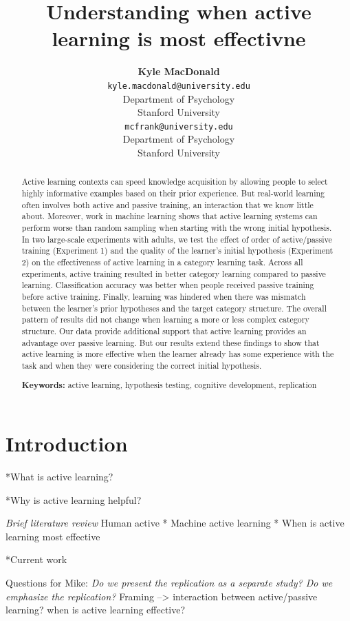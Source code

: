 \documentclass[10pt, letterpaper]{article}
\title{Understanding when active learning is most effectivne}
\author{{\large \bf Kyle MacDonald} \\ \texttt{kyle.macdonald@university.edu} \\ Department of Psychology \\ Stanford University \And {\large \bf Michael C. Frank} \\ \texttt{mcfrank@university.edu} \\ Department of Psychology \\ Stanford University}
\begin{document}
\maketitle

\begin{abstract}
Active learning contexts can speed knowledge acquisition by allowing
people to select highly informative examples based on their prior
experience. But real-world learning often involves both active and
passive training, an interaction that we know little about. Moreover,
work in machine learning shows that active learning systems can perform
worse than random sampling when starting with the wrong initial
hypothesis. In two large-scale experiments with adults, we test the
effect of order of active/passive training (Experiment 1) and the
quality of the learner's initial hypothesis (Experiment 2) on the
effectiveness of active learning in a category learning task. Across all
experiments, active training resulted in better category learning
compared to passive learning. Classification accuracy was better when
people received passive training before active training. Finally,
learning was hindered when there was mismatch between the learner's
prior hypotheses and the target category structure. The overall pattern
of results did not change when learning a more or less complex category
structure. Our data provide additional support that active learning
provides an advantage over passive learning. But our results extend
these findings to show that active learning is more effective when the
learner already has some experience with the task and when they were
considering the correct initial hypothesis.

\textbf{Keywords:}
active learning, hypothesis testing, cognitive development, replication
\end{abstract}

\section{Introduction}\label{introduction}

*What is active learning?

*Why is active learning helpful?

\emph{Brief literature review } Human active * Machine active learning *
When is active learning most effective

*Current work

Questions for Mike: \emph{Do we present the replication as a separate
study? Do we emphasize the replication? }Framing --\textgreater{}
interaction between active/passive learning? when is active learning
effective?
\end{document}
